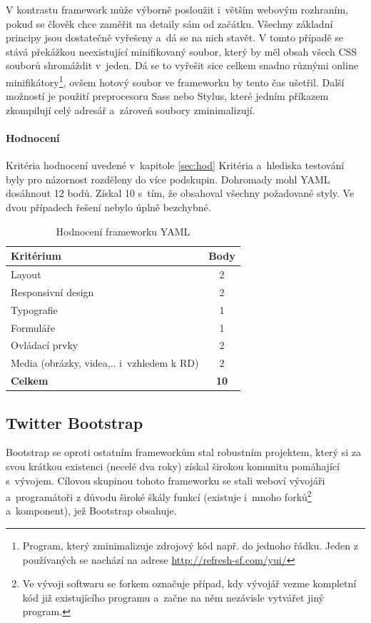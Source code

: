 \documentclass[thesis=B,czech]{FITthesis}[2012/06/26]
\begin{document}
V kontrastu framework může výborně posloužit i~větším webovým rozhraním, pokud se člověk chce zaměřit na detaily sám od začátku. Všechny základní principy jsou dostatečně vyřešeny a~dá se na nich stavět. V tomto případě se stává překážkou neexistující minifikovaný soubor, který by měl obsah  všech CSS souborů shromáždit v~jeden. Dá se to vyřešit sice celkem snadno různými online minifikátory\footnote{Program, který zminimalizuje zdrojový kód např. do jednoho řádku. Jeden z používaných se nachází na adrese \url{http://refresh-sf.com/yui/}}, ovšem hotový soubor ve frameworku by tento čas ušetřil. Další možností je použití preprocesoru Sass nebo Stylus, které jedním příkazem zkompilují celý adresář a~zároveň soubory zminimalizují.

\paragraph{Hodnocení}

Kritéria hodnocení uvedené v~kapitole \ref{sec:hod} Kritéria a~hlediska testování byly pro názornost rozděleny do více podskupin. Dohromady mohl YAML dosáhnout 12 bodů. Získal 10 s~tím, že obsahoval všechny požadované styly. Ve dvou případech řešení nebylo úplně bezchybné.

\begin{table}\centering
 	\caption[Hodnocení YAMLu]{Hodnocení frameworku YAML}\label{tab:yaml}
 	\begin{tabular}{|l|c|}\hline
 		\textbf{Kritérium} & \textbf{Body}\tabularnewline
  		\hline \hline
		Layout & 2\tabularnewline
		\hline 
		 Responsivní design & 2\tabularnewline
		\hline 
		Typografie & 1\tabularnewline
		\hline 
		Formuláře & 1\tabularnewline
		\hline 
		Ovládací prvky & 2\tabularnewline
		\hline 
		Media  (obrázky, videa,.. i~vzhledem k RD) & 2\tabularnewline
		\hline 
		\textbf{Celkem} & \textbf{10}\tabularnewline
		\hline 
 	\end{tabular}
\end{table} 

\subsection{Twitter Bootstrap}
\label{sec:boots}

Bootstrap se oproti ostatním frameworkům stal robustním projektem, který si za svou krátkou existenci (necelé dva roky) získal širokou komunitu pomáhající s~vývojem. Cílovou skupinou tohoto frameworku se stali weboví vývojáři a~programátoři z důvodu široké škály funkcí (existuje i~mnoho forků\footnote{Ve vývoji softwaru se forkem označuje případ, kdy vývojář vezme kompletní kód již existujícího programu a~začne na něm nezávisle vytvářet jiný program.} a~komponent), jež Bootstrap obsahuje. 
\end{document}
